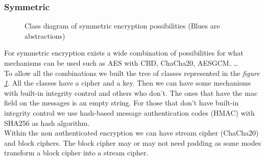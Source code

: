 \documentclass[12pt]{article}
\begin{document}
\subsubsection{Symmetric}
\begin{figure}[h]
  \caption{Class diagram of symmetric encryption possibilities (Blues are abstractions)}
  \label{fig:symmetric}
\end{figure}
For symmetric encryption exists a wide combination of possibilities for what mechanisms can be used such as AES with CBD, ChaCha20, AESGCM, \ldots \\
To allow all the combinations we built the tree of classes represented in the \textit{figure \ref{fig:symmetric}}. All
  the classes have a cipher and a key. Then we can have some mechanisms with built-in integrity control
  and others who don't. The ones that have the mac field on the messages is an empty string. For those that
  don't have built-in integrity control we use hash-based message authentication codes (HMAC) with SHA256 as hash algorithm. \\ 
Within the non authenticated encryption we can have stream cipher (ChaCha20) and block ciphers. 
  The block cipher may or may not need padding as some modes transform a block cipher into a stream cipher.
\end{document}
